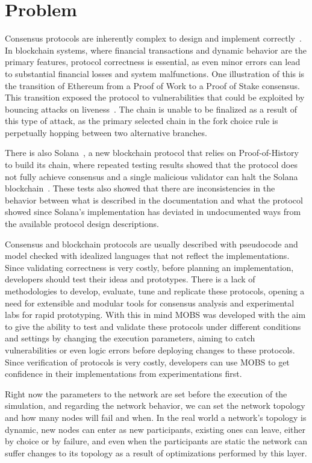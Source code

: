 \section{Problem}\label{sub:problem}
Consensus protocols are inherently complex to design and implement correctly~\cite{paxos, have_we_reached_consensus}.
In blockchain systems, where financial transactions and dynamic behavior are the primary features, protocol correctness is essential,
as even minor errors can lead to substantial financial losses and system malfunctions. One illustration of this is the transition of
Ethereum from a Proof of Work to a Proof of Stake consensus. This transition exposed the protocol to vulnerabilities that could be
exploited by bouncing attacks on liveness~\cite{ethereum_analysis}.
The chain is unable to be finalized as a result of this type of attack, as the primary selected chain in the fork
choice rule is perpetually hopping between two alternative branches.

There is also Solana~\cite{solana}, a new blockchain protocol that relies on Proof-of-History to build its chain,
where repeated testing results showed that the protocol does not fully achieve consensus and
a single malicious validator can halt the Solana blockchain~\cite{solana_halting_problem}. These tests also showed that there are
inconsistencies in the behavior between what is described in the documentation and what the protocol showed since Solana's implementation
has deviated in undocumented ways from the available protocol design descriptions.

Consensus and blockchain protocols are usually described with pseudocode and model checked with idealized languages that 
not reflect the implementations. Since validating correctness is very costly\cite{desidn_and_validation}, before planning an
implementation, developers should test their ideas and prototypes. There is a lack of methodologies to develop,
evaluate, tune and replicate these protocols, opening a need for extensible and modular tools for consensus analysis and
experimental labs for rapid prototyping.
With this in mind MOBS was developed with the aim to give the ability to test and validate these protocols under different conditions and settings by 
changing the execution parameters, aiming to catch vulnerabilities or even logic errors before deploying changes to these protocols.
Since verification of protocols is very costly, developers can use MOBS to get confidence in their implementations
from experimentations first.

Right now the parameters to the network are set before the execution of the simulation, and regarding the network behavior, we can
set the network topology and how many nodes will fail and when. In the real world a network's topology is dynamic, new nodes can enter
as new participants, existing ones can leave, either by choice or by failure, and even when the participants are static the network
can suffer changes to its topology as a result of optimizations performed by this layer.

